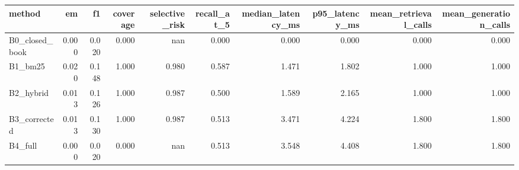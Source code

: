 \begin{tabular}{lrrrrrrrrr}
\toprule
method & em & f1 & coverage & selective\_risk & recall\_at\_5 & median\_latency\_ms & p95\_latency\_ms & mean\_retrieval\_calls & mean\_generation\_calls \\
\midrule
B0\_closed\_book & 0.000 & 0.020 & 0.000 & nan & 0.000 & 0.000 & 0.000 & 0.000 & 0.000 \\
B1\_bm25 & 0.020 & 0.148 & 1.000 & 0.980 & 0.587 & 1.471 & 1.802 & 1.000 & 1.000 \\
B2\_hybrid & 0.013 & 0.126 & 1.000 & 0.987 & 0.500 & 1.589 & 2.165 & 1.000 & 1.000 \\
B3\_corrected & 0.013 & 0.130 & 1.000 & 0.987 & 0.513 & 3.471 & 4.224 & 1.800 & 1.800 \\
B4\_full & 0.000 & 0.020 & 0.000 & nan & 0.513 & 3.548 & 4.408 & 1.800 & 1.800 \\
\bottomrule
\end{tabular}
